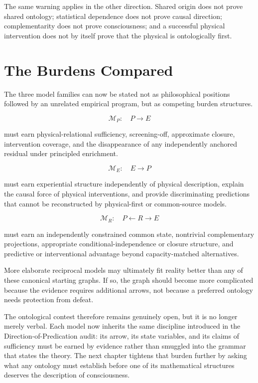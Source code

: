 The same warning applies in the other direction. Shared origin does not prove shared ontology; statistical dependence does not prove causal direction; complementarity does not prove consciousness; and a successful physical intervention does not by itself prove that the physical is ontologically first.

\section{The Burdens Compared}

The three model families can now be stated not as philosophical positions followed by an unrelated empirical program, but as competing burden structures.

\[
\mathcal M_P:\quad P\rightarrow E
\]

must earn physical-relational sufficiency, screening-off, approximate closure, intervention coverage, and the disappearance of any independently anchored residual under principled enrichment.

\[
\mathcal M_E:\quad E\rightarrow P
\]

must earn experiential structure independently of physical description, explain the causal force of physical interventions, and provide discriminating predictions that cannot be reconstructed by physical-first or common-source models.

\[
\mathcal M_R:\quad P\leftarrow R\rightarrow E
\]

must earn an independently constrained common state, nontrivial complementary projections, appropriate conditional-independence or closure structure, and predictive or interventional advantage beyond capacity-matched alternatives.

More elaborate reciprocal models may ultimately fit reality better than any of these canonical starting graphs. If so, the graph should become more complicated because the evidence requires additional arrows, not because a preferred ontology needs protection from defeat.

The ontological contest therefore remains genuinely open, but it is no longer merely verbal. Each model now inherits the same discipline introduced in the Direction-of-Predication audit: its arrow, its state variables, and its claims of sufficiency must be earned by evidence rather than smuggled into the grammar that states the theory. The next chapter tightens that burden further by asking what any ontology must establish before one of its mathematical structures deserves the description of consciousness.
